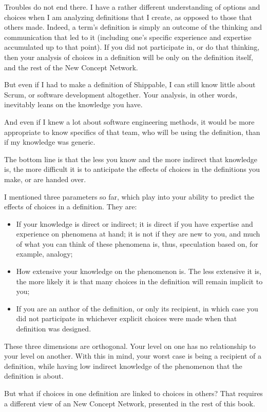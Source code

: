 \documentclass[graybox,envcountchap,sectrefs]{svmono}
\newcommand{\ncnf}{New Concept Network}
\begin{document}
Troubles do not end there. I have a rather different understanding of options and choices when I am analyzing definitions that I create, as opposed to those that others made. Indeed, a term's definition is simply an outcome of the thinking and communication that led to it (including one's specific experience and expertise accumulated up to that point). If you did not participate in, or do that thinking, then your analysis of choices in a definition will be only on the definition itself, and the rest of the \ncnf{}.

But even if I had to make a definition of Shippable, I can still know little about Scrum, or software development altogether. Your analysis, in other words, inevitably leans on the knowledge you have.

And even if I knew a lot about software engineering methods, it would be more appropriate to know specifics of that team, who will be using the definition, than if my knowledge was generic.

The bottom line is that the less you know and the more indirect that knowledge is, the more difficult it is to anticipate the effects of choices in the definitions you make, or are handed over.

I mentioned three parameters so far, which play into your ability to predict the effects of choices in a definition. They are:
\begin{itemize}
	\item If your knowledge is direct or indirect; it is direct if you have expertise and experience on phenomena at hand; it is not if they are new to you, and much of what you can think of these phenomena is, thus, speculation based on, for example, analogy;
	\item How extensive your knowledge on the phenomenon is. The less extensive it is, the more likely it is that many choices in the definition will remain implicit to you;
	\item If you are an author of the definition, or only its recipient, in which case you did not participate in whichever explicit choices were made when that definition was designed.
\end{itemize}

These three dimensions are orthogonal. Your level on one has no relationship to your level on another. With this in mind, your worst case is being a recipient of a definition, while having low indirect knowledge of the phenomenon that the definition is about.

But what if choices in one definition are linked to choices in others? That requires a different view of an \ncnf{}, presented in the rest of this book.
\end{document}
